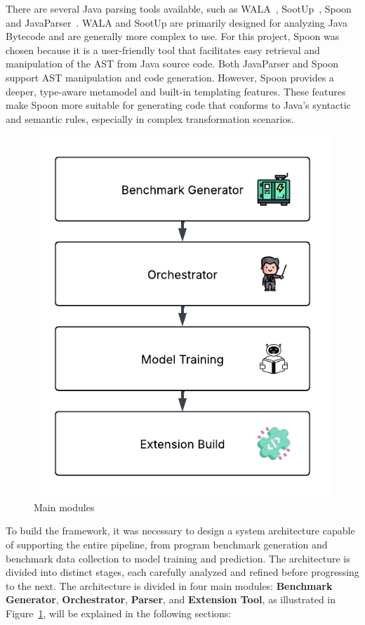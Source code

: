 There are several Java parsing tools available, such as WALA~\cite{wala_main}, SootUp~\cite{sootup_main}, Spoon~\cite{spoon_main} and JavaParser~\cite{javaParser}. WALA and SootUp are primarily designed for analyzing Java Bytecode and are generally more complex to use. For this project, Spoon was chosen because it is a user-friendly tool that facilitates easy retrieval and manipulation of the AST from Java source code. Both JavaParser and Spoon support AST manipulation and code generation. However, Spoon provides a deeper, type-aware metamodel and built-in templating features. These features make Spoon more suitable for generating code that conforms to Java’s syntactic and semantic rules, especially in complex transformation scenarios.


\begin{figure}[htbp]
  \centering
  \includegraphics[scale=0.7]{figures/main_modules.pdf}
  \caption{Main modules}
  \label{fig:main_modules}
\end{figure}




To build the framework, it was necessary to design a system architecture capable of supporting the entire pipeline, from program benchmark generation and benchmark data collection to model training and prediction. The architecture is divided into distinct stages, each carefully analyzed and refined before progressing to the next.
The architecture is divided in four main modules: \textbf{Benchmark Generator}, \textbf{Orchestrator}, \textbf{Parser}, and \textbf{Extension Tool}, as illustrated in Figure~\ref{fig:main_modules}, will be explained in the following sections:










